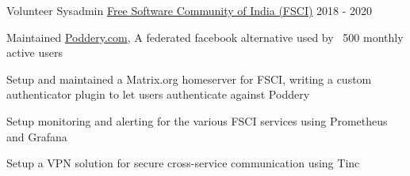 \begin{cventries}
    \cventry
    {Volunteer Sysadmin} %
    {\href{https://fsci.in}{Free Software Community of India (FSCI)}} %
    {} %
    {2018 - 2020} %
    {
      \begin{cvitems} %
        \item {Maintained \href{https://poddery.com}{Poddery.com}, A federated facebook alternative used by ~500 monthly active users}
        \item {Setup and maintained a Matrix.org homeserver for FSCI, writing a custom authenticator plugin to let users authenticate against Poddery}
        \item {Setup monitoring and alerting for the various FSCI services using Prometheus and Grafana}
        \item {Setup a VPN solution for secure cross-service communication using Tinc}
      \end{cvitems}
    }
\end{cventries}
